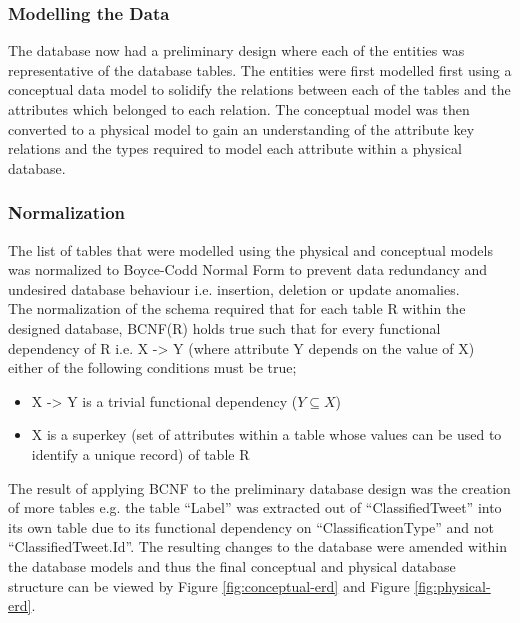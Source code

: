 \documentclass[11pt]{report}
\begin{document}
\subsubsection*{Modelling the Data}
The database now had a preliminary design where each of the entities was representative of the database tables. The entities were first modelled first using a conceptual data model to solidify the relations between each of the tables and the attributes which belonged to each relation. The conceptual model was then converted to a physical model to gain an understanding of the attribute key relations and the types required to model each attribute within a physical database.

\subsubsection*{Normalization}
The list of tables that were modelled using the physical and conceptual models was normalized to Boyce-Codd Normal Form \citep*{CoddRecentInvestigationsRelational1974} to prevent data redundancy and undesired database behaviour i.e. insertion, deletion or update anomalies.
\\

The normalization of the schema required that for each table R within the designed database, BCNF(R) holds true such that for every functional dependency of R i.e. X -> Y (where attribute Y depends on the value of X) either of the following conditions must be true;

\begin{itemize}
\item X -> Y is a trivial functional dependency ($Y  \subseteq X$) 
\item X is a superkey (set of attributes within a table whose values can be used to identify a unique record) of table R
\end{itemize}

The result of applying BCNF to the preliminary database design was the creation of more tables e.g. the table ``Label'' was extracted out of ``Classified\textunderscore Tweet'' into its own table due to its functional dependency on ``Classification\textunderscore Type'' and not ``Classified\textunderscore Tweet.Id''. The resulting changes to the database were amended within the database models and thus the final conceptual and physical database structure can be viewed by Figure \ref{fig:conceptual-erd} and Figure \ref{fig:physical-erd}.
\end{document}
